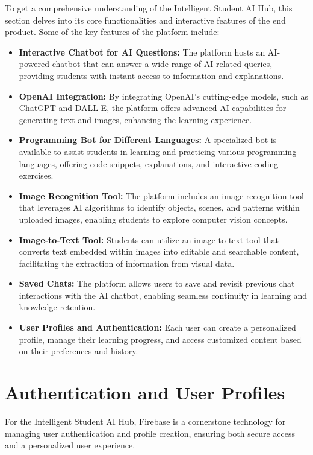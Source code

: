 To get a comprehensive understanding of the Intelligent Student AI Hub, this section delves into its core functionalities and interactive features of the end product.
Some of the key features of the platform include:
\begin{itemize}
    \item \textbf{Interactive Chatbot for AI Questions:} The platform hosts an AI-powered chatbot that can answer a wide range of AI-related queries, providing students with instant access to information and explanations.
    \item \textbf{OpenAI Integration:} By integrating OpenAI’s cutting-edge models, such as ChatGPT and DALL-E, the platform offers advanced AI capabilities for generating text and images, enhancing the learning experience.
    \item \textbf{Programming Bot for Different Languages:} A specialized bot is available to assist students in learning and practicing various programming languages, offering code snippets, explanations, and interactive coding exercises.
    \item \textbf{Image Recognition Tool:} The platform includes an image recognition tool that leverages AI algorithms to identify objects, scenes, and patterns within uploaded images, enabling students to explore computer vision concepts.
    \item \textbf{Image-to-Text Tool:} Students can utilize an image-to-text tool that converts text embedded within images into editable and searchable content, facilitating the extraction of information from visual data.
    \item \textbf{Saved Chats:} The platform allows users to save and revisit previous chat interactions with the AI chatbot, enabling seamless continuity in learning and knowledge retention.
    \item \textbf{User Profiles and Authentication:} Each user can create a personalized profile, manage their learning progress, and access customized content based on their preferences and history.
\end{itemize}

\section{Authentication and User Profiles}

For the Intelligent Student AI Hub, Firebase is a cornerstone technology for managing user authentication and profile creation, ensuring both secure access and a personalized user experience.

